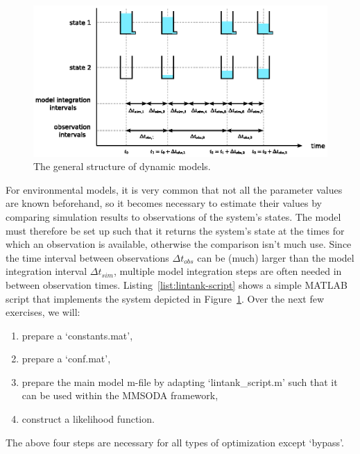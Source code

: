 \begin{figure}[htb]
  \centering
    \includegraphics[width=\textwidth]{./../eps/states-and-flows.eps}
  \caption{The general structure of dynamic models.}
  \label{fig:states-and-flows}
\end{figure}

For environmental models, it is very common that not all the parameter values are known beforehand, so it becomes necessary to estimate their values by comparing simulation results to observations of the system's states. The model must therefore be set up such that it returns the system's state at the times for which an observation is available, otherwise the comparison isn't much use. Since the time interval between observations $\Delta{}t_{obs}$ can be (much) larger than the model integration interval $\Delta{}t_{sim}$, multiple model integration steps are often needed in between observation times. Listing~\ref{list:lintank-script} shows a simple MATLAB script that implements the system depicted in Figure~\ref{fig:states-and-flows}. Over the next few exercises, we will:
\begin{enumerate}
\item{prepare a `constants.mat',}
\item{prepare a `conf.mat',}
\item{prepare the main model m-file by adapting `lintank\_script.m' such that it can be used within the MMSODA framework,}
\item{construct a likelihood function.}
\end{enumerate}
The above four steps are necessary for all types of optimization except `bypass'.



